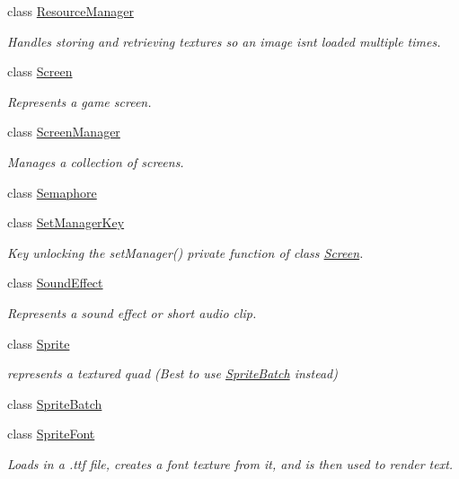 \begin{DoxyCompactItemize}
class \hyperlink{classnta_1_1ResourceManager}{Resource\+Manager}
\begin{DoxyCompactList}\small\item\em Handles storing and retrieving textures so an image isn\textquotesingle{}t loaded multiple times. \end{DoxyCompactList}\item 
class \hyperlink{classnta_1_1Screen}{Screen}
\begin{DoxyCompactList}\small\item\em Represents a game screen. \end{DoxyCompactList}\item 
class \hyperlink{classnta_1_1ScreenManager}{Screen\+Manager}
\begin{DoxyCompactList}\small\item\em Manages a collection of screens. \end{DoxyCompactList}\item 
class \hyperlink{classnta_1_1Semaphore}{Semaphore}
\item 
class \hyperlink{classnta_1_1SetManagerKey}{Set\+Manager\+Key}
\begin{DoxyCompactList}\small\item\em Key unlocking the set\+Manager() private function of class \hyperlink{classnta_1_1Screen}{Screen}. \end{DoxyCompactList}\item 
class \hyperlink{classnta_1_1SoundEffect}{Sound\+Effect}
\begin{DoxyCompactList}\small\item\em Represents a sound effect or short audio clip. \end{DoxyCompactList}\item 
class \hyperlink{classnta_1_1Sprite}{Sprite}
\begin{DoxyCompactList}\small\item\em represents a textured quad (Best to use \hyperlink{classnta_1_1SpriteBatch}{Sprite\+Batch} instead) \end{DoxyCompactList}\item 
class \hyperlink{classnta_1_1SpriteBatch}{Sprite\+Batch}
\item 
class \hyperlink{classnta_1_1SpriteFont}{Sprite\+Font}
\begin{DoxyCompactList}\small\item\em Loads in a .ttf file, creates a font texture from it, and is then used to render text. \end{DoxyCompactList}\item 

\end{DoxyCompactItemize}
